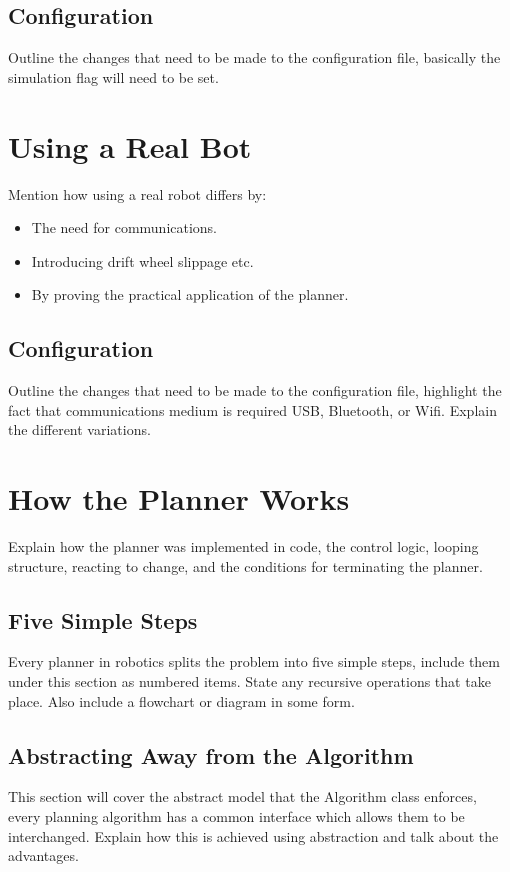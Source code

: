 \subsection{Configuration}
Outline the changes that need to be made to the configuration file, basically the simulation flag will need to be set.


\section{Using a Real Bot}
Mention how using a real robot differs by:

\begin{itemize}
\item The need for communications.
\item Introducing drift wheel slippage etc.
\item By proving the practical application of the planner.
\end{itemize}

\subsection{Configuration}
Outline the changes that need to be made to the configuration file, highlight the fact that communications medium is required USB, Bluetooth, or Wifi. Explain the different variations.


\section{How the Planner Works}
Explain how the planner was implemented in code, the control logic, looping structure, reacting to change, and the conditions for terminating the planner.

\subsection{Five Simple Steps}
Every planner in robotics splits the problem into five simple steps, include them under this section as numbered items. State any recursive operations that take place. Also include a flowchart or diagram in some form.

\subsection{Abstracting Away from the Algorithm}
This section will cover the abstract model that the Algorithm class enforces, every planning algorithm has a common interface which allows them to be interchanged. Explain how this is achieved using abstraction and talk about the advantages.

